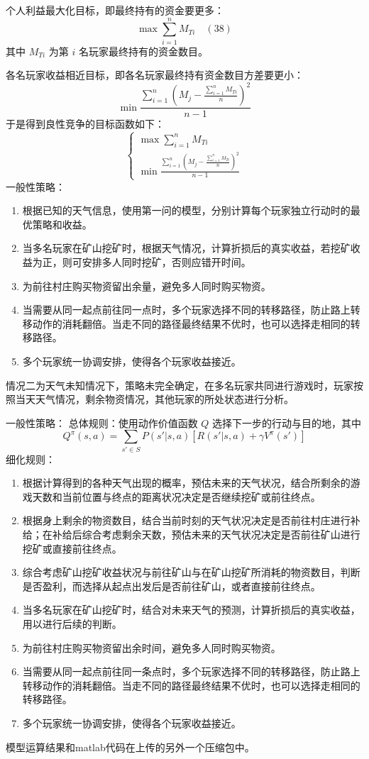 \documentclass[UTF8]{article}
\begin{document}
个人利益最大化目标，即最终持有的资金要更多：
\[
\max \sum_{i=1}^{n} M_{Ti} \quad (38)
\]
其中 \(M_{Ti}\) 为第 \(i\) 名玩家最终持有的资金数目。

各名玩家收益相近目标，即各名玩家最终持有资金数目方差要更小：
\[
\min \frac{\sum_{i=1}^{n}(M_j - \frac{\sum_{i=1}^{n} M_{Ti}}{n})^2}{n-1} 
\]
于是得到良性竞争的目标函数如下：
\[
\begin{cases}
\max \sum_{i=1}^{n} M_{Ti} \\
\min \frac{\sum_{i=1}^{n}(M_j - \frac{\sum_{i=1}^{n} M_{Ti}}{n})^2}{n-1}
\end{cases}
\]
一般性策略：
\begin{enumerate}
    \item 根据已知的天气信息，使用第一问的模型，分别计算每个玩家独立行动时的最优策略和收益。
    \item 当多名玩家在矿山挖矿时，根据天气情况，计算折损后的真实收益，若挖矿收益为正，则可安排多人同时挖矿，否则应错开时间。
    \item 为前往村庄购买物资留出余量，避免多人同时购买物资。
    \item 当需要从同一起点前往同一点时，多个玩家选择不同的转移路径，防止路上转移动作的消耗翻倍。当走不同的路径最终结果不优时，也可以选择走相同的转移路径。
    \item 多个玩家统一协调安排，使得各个玩家收益接近。
\end{enumerate}
情况二为天气未知情况下，策略未完全确定，在多名玩家共同进行游戏时，玩家按照当天天气情况，剩余物资情况，其他玩家的所处状态进行分析。

一般性策略：
总体规则：使用动作价值函数 \(Q\) 选择下一步的行动与目的地，其中
\[
Q^\pi(s,a) = \sum_{s' \in S} P(s'|s,a)[R(s'|s,a) + \gamma V^\pi(s')] 
\]
细化规则：
\begin{enumerate}
    \item 根据计算得到的各种天气出现的概率，预估未来的天气状况，结合所剩余的游戏天数和当前位置与终点的距离状况决定是否继续挖矿或前往终点。
    \item 根据身上剩余的物资数目，结合当前时刻的天气状况决定是否前往村庄进行补给；在补给后综合考虑剩余天数，预估未来的天气状况决定是否前往矿山进行挖矿或直接前往终点。
    \item 综合考虑矿山挖矿收益状况与前往矿山与在矿山挖矿所消耗的物资数目，判断是否盈利，而选择从起点出发后是否前往矿山，或者直接前往终点。
    \item 当多名玩家在矿山挖矿时，结合对未来天气的预测，计算折损后的真实收益，用以进行后续的判断。
    \item 为前往村庄购买物资留出余时间，避免多人同时购买物资。
    \item 当需要从同一起点前往同一条点时，多个玩家选择不同的转移路径，防止路上转移动作的消耗翻倍。当走不同的路径最终结果不优时，也可以选择走相同的转移路径。
    \item 多个玩家统一协调安排，使得各个玩家收益接近。
\end{enumerate}

模型运算结果和matlab代码在上传的另外一个压缩包中。
\end{document}
